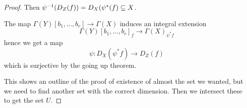 \begin{proof}
    Then $\psi^{-1}(D_Z(f)) = D_X(\psi^*(f)\subseteq X$.
    
    The map $\Gamma(Y)[b_1, \ldots, b_r] \longrightarrow \Gamma(X)$ induces an integral extension 
    \begin{equation*}
        \Gamma(Y)[b_1, \ldots, b_r]_f \longrightarrow \Gamma(X)_{\psi^* f}
    \end{equation*}
    hence we get a map
    \begin{equation*}
        \psi: D_X(\psi^* f)\longrightarrow D_Z(f)
    \end{equation*}
    which is surjective by the going up theorem. 
    
    This shows an outline of the proof of existence of almost the set we wanted, but we need to find another set with the correct dimension. Then we intersect these to get the set $U$. 

\end{proof}


